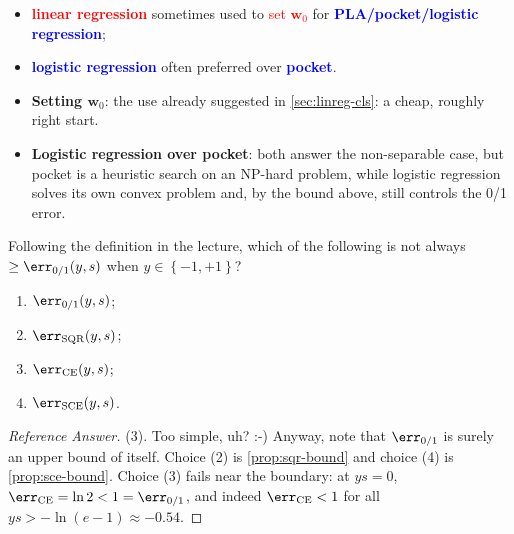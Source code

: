 \begin{moral}
    \begin{itemize}
        \item \textcolor{red}{\textbf{linear regression}} sometimes used to
            \textcolor{red}{set \(\bm{w}_0\)} for
            \textcolor{blue}{\textbf{PLA/pocket/logistic regression}};
        \item \textcolor{blue}{\textbf{logistic regression}} often preferred
            over \textcolor{blue}{\textbf{pocket}}.
    \end{itemize}
\end{moral}

\begin{itemize}
    \item \textbf{Setting \(\bm{w}_0\)}: the use already suggested in
        \autoref{sec:linreg-cls}: a cheap, roughly right start.
    \item \textbf{Logistic regression over pocket}: both answer the
        non-separable case, but pocket is a heuristic search on an NP-hard
        problem, while logistic regression solves its own convex problem and,
        by the bound above, still controls the 0/1 error.
\end{itemize}

\begin{exercise}
    Following the definition in the lecture, which of the following is not
    always \(\ge \err_{0/1}(y, s)\) when \(y \in \left\{ -1, +1 \right\}\)?
    \begin{enumerate}[(1)]
        \item \(\err_{0/1}(y, s)\);
        \item \(\err_{\mathrm{SQR}}(y, s)\);
        \item \(\err_{\mathrm{CE}}(y, s)\);
        \item \(\err_{\mathrm{SCE}}(y, s)\).
    \end{enumerate}
\end{exercise}

\begin{proof}[Reference Answer]
    (3). Too simple, uh? :-) Anyway, note that \(\err_{0/1}\) is surely an
    upper bound of itself. Choice (2) is \autoref{prop:sqr-bound} and choice (4)
    is \autoref{prop:sce-bound}. Choice (3) fails near the boundary: at \(ys =
    0\), \(\err_{\mathrm{CE}} = \ln 2 < 1 = \err_{0/1}\), and indeed
    \(\err_{\mathrm{CE}} < 1\) for all \(ys > -\ln(e - 1) \approx -0.54\).
\end{proof}

